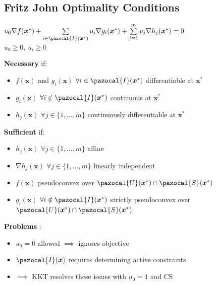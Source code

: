 \documentclass[english]{latex4ei/latex4ei_sheet}
\begin{document}
\begin{sectionbox}
	\subsection{Fritz John Optimality Conditions}
	\begin{center}
		$u_0 \nabla f(\bm{x}^*) + \sum\limits_{i \in \pazocal{I}(\bm{x}^*)}^{} u_i\nabla g_i(\bm{x}^*) + \sum\limits_{j=1}^{m} v_j \nabla h_j(\bm{x}^*) = 0$ \\
		$u_0 \geq 0$, $u_i \geq 0$
	\end{center}

	\textbf{Necessary} if:
	\begin{itemize}
		\item $f(\bm{x})$ and $g_i(\bm{x})$ $\forall i \in \pazocal{I}(\bm{x}^*)$ differentiable at $\bm{x}^*$
		\item $g_i(\bm{x})$ $\forall i \notin \pazocal{I}(\bm{x}^*)$ continuous at $\bm{x}^*$
		\item $h_j(\bm{x})$ $\forall j \in \{1, \dots, m\}$ continuously differentiable at $\bm{x}^*$
	\end{itemize}
	\textbf{Sufficient} if:
	\begin{itemize}
		\item $h_j(\bm{x})$ $\forall j \in \{1, \dots, m\}$ affine
		\item $\nabla h_j(\bm{x})$ $\forall j \in \{1, \dots, m\}$ linearly independent
		\item $f(\bm{x})$ pseudoconvex over $\pazocal{U}(\bm{x}^*) \cap \pazocal{S}(\bm{x}^*)$
		\item $g_i(\bm{x})$ $\forall i \notin \pazocal{I}(\bm{x}^*)$ strictly pseudoconvex over $\pazocal{U}(\bm{x}^*) \cap \pazocal{S}(\bm{x}^*)$
	\end{itemize}
	\textbf{Problems} :
	\begin{itemize}
		\item $u_0 = 0$ allowed $\implies$ ignores objective
		\item $\pazocal{I}(\bm{x})$ requires determining active constraints
		\item[] $\implies$ KKT resolves these issues with $u_0 = 1$ and CS
	\end{itemize}
	
\end{sectionbox}
\end{document}
